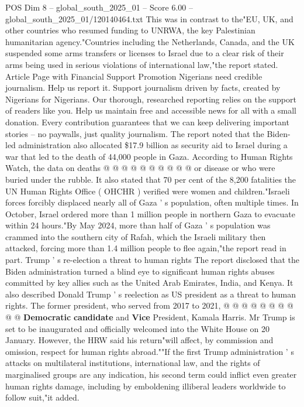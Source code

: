 \begin{textsample}{POS Dim 8 – global\_south\_2025\_01 – Score 6.00 – global\_south\_2025\_01/120140464.txt}  \label{ex:f8_pos_323}
This was in contrast to the"EU, UK, and other countries who resumed funding to UNRWA, the key Palestinian humanitarian agency."Countries including the Netherlands, Canada, and the UK suspended some arms transfers or licenses to Israel due to a clear risk of their arms being used in serious violations of international law,"the report stated.
Article Page with Financial Support Promotion Nigerians need credible journalism.
Help us report it.
Support journalism driven by facts, created by Nigerians for Nigerians.
Our thorough, researched reporting relies on the support of readers like you.
Help us maintain free and accessible news for all with a small donation.
Every contribution guarantees that we can keep delivering important stories -- no paywalls, just quality journalism.
The report noted that the Biden-led administration also allocated \$17.9 billion as security aid to Israel during a war that led to the death of 44,000 people in Gaza.
According to Human Rights Watch, the data on deaths @ @ @ @ @ @ @ @ @ @ or disease or who were buried under the rubble.
It also stated that 70 per cent of the 8,200 fatalities the UN Human Rights Office ( OHCHR ) verified were women and children."Israeli forces forcibly displaced nearly all of Gaza ' s population, often multiple times.
In October, Israel ordered more than 1 million people in northern Gaza to evacuate within 24 hours."By May 2024, more than half of Gaza ' s population was crammed into the southern city of Rafah, which the Israeli military then attacked, forcing more than 1.4 million people to flee again,"the report read in part.
Trump ' s re-election a threat to human rights The report disclosed that the Biden administration turned a blind eye to significant human rights abuses committed by key allies such as the United Arab Emirates, India, and Kenya.
It also described Donald Trump ' s reelection as US president as a threat to human rights.
The former president, who served from 2017 to 2021, @ @ @ @ @ @ @ @ @ @ \textbf{Democratic} \textbf{candidate} and \textbf{Vice} President, Kamala Harris.
Mr Trump is set to be inaugurated and officially welcomed into the White House on 20 January.
However, the HRW said his return"will affect, by commission and omission, respect for human rights abroad.""If the first Trump administration ' s attacks on multilateral institutions, international law, and the rights of marginalised groups are any indication, his second term could inflict even greater human rights damage, including by emboldening illiberal leaders worldwide to follow suit,"it added.

\end{textsample}
